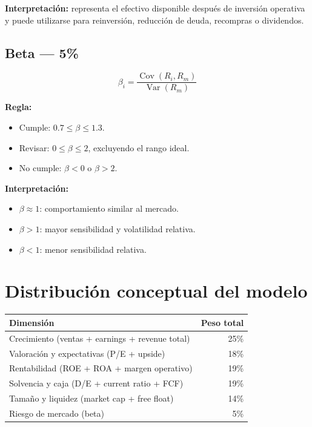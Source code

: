\documentclass[11pt,a4paper]{article}
\begin{document}
\textbf{Interpretación:} representa el efectivo disponible después de inversión operativa y puede utilizarse para reinversión, reducción de deuda, recompras o dividendos.

\subsection{Beta --- 5\%}
\[
\boxed{
\beta_i=
\frac{\operatorname{Cov}(R_i,R_m)}
{\operatorname{Var}(R_m)}
}
\]

\textbf{Regla:}
\begin{itemize}[leftmargin=*]
\item Cumple: $0.7\leq\beta\leq1.3$.
\item Revisar: $0\leq\beta\leq2$, excluyendo el rango ideal.
\item No cumple: $\beta<0$ o $\beta>2$.
\end{itemize}

\textbf{Interpretación:}
\begin{itemize}[leftmargin=*]
\item $\beta\approx1$: comportamiento similar al mercado.
\item $\beta>1$: mayor sensibilidad y volatilidad relativa.
\item $\beta<1$: menor sensibilidad relativa.
\end{itemize}

\section{Distribución conceptual del modelo}

\begin{center}
\begin{tabular}{lr}
\toprule
\textbf{Dimensión} & \textbf{Peso total}\\
\midrule
Crecimiento (ventas + earnings + revenue total) & 25\%\\
Valoración y expectativas (P/E + upside) & 18\%\\
Rentabilidad (ROE + ROA + margen operativo) & 19\%\\
Solvencia y caja (D/E + current ratio + FCF) & 19\%\\
Tamaño y liquidez (market cap + free float) & 14\%\\
Riesgo de mercado (beta) & 5\%\\
\bottomrule
\end{tabular}
\end{center}
\end{document}
